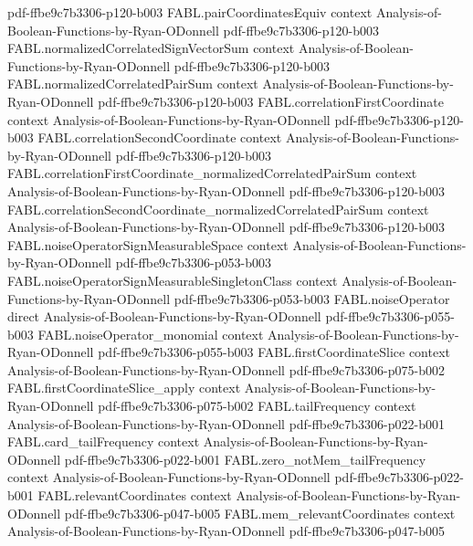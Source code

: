 \begin{theorem}
  {pdf-ffbe9c7b3306-p120-b003}
\proofstep
  {FABL.pairCoordinatesEquiv}
  {context}
  {Analysis-of-Boolean-Functions-by-Ryan-ODonnell}
  {pdf-ffbe9c7b3306-p120-b003}
\proofstep
  {FABL.normalizedCorrelatedSignVectorSum}
  {context}
  {Analysis-of-Boolean-Functions-by-Ryan-ODonnell}
  {pdf-ffbe9c7b3306-p120-b003}
\proofstep
  {FABL.normalizedCorrelatedPairSum}
  {context}
  {Analysis-of-Boolean-Functions-by-Ryan-ODonnell}
  {pdf-ffbe9c7b3306-p120-b003}
\proofstep
  {FABL.correlationFirstCoordinate}
  {context}
  {Analysis-of-Boolean-Functions-by-Ryan-ODonnell}
  {pdf-ffbe9c7b3306-p120-b003}
\proofstep
  {FABL.correlationSecondCoordinate}
  {context}
  {Analysis-of-Boolean-Functions-by-Ryan-ODonnell}
  {pdf-ffbe9c7b3306-p120-b003}
\proofstep
  {FABL.correlationFirstCoordinate_normalizedCorrelatedPairSum}
  {context}
  {Analysis-of-Boolean-Functions-by-Ryan-ODonnell}
  {pdf-ffbe9c7b3306-p120-b003}
\proofstep
  {FABL.correlationSecondCoordinate_normalizedCorrelatedPairSum}
  {context}
  {Analysis-of-Boolean-Functions-by-Ryan-ODonnell}
  {pdf-ffbe9c7b3306-p120-b003}
\proofstep
  {FABL.noiseOperatorSignMeasurableSpace}
  {context}
  {Analysis-of-Boolean-Functions-by-Ryan-ODonnell}
  {pdf-ffbe9c7b3306-p053-b003}
\proofstep
  {FABL.noiseOperatorSignMeasurableSingletonClass}
  {context}
  {Analysis-of-Boolean-Functions-by-Ryan-ODonnell}
  {pdf-ffbe9c7b3306-p053-b003}
\proofstep
  {FABL.noiseOperator}
  {direct}
  {Analysis-of-Boolean-Functions-by-Ryan-ODonnell}
  {pdf-ffbe9c7b3306-p055-b003}
\proofstep
  {FABL.noiseOperator_monomial}
  {context}
  {Analysis-of-Boolean-Functions-by-Ryan-ODonnell}
  {pdf-ffbe9c7b3306-p055-b003}
\proofstep
  {FABL.firstCoordinateSlice}
  {context}
  {Analysis-of-Boolean-Functions-by-Ryan-ODonnell}
  {pdf-ffbe9c7b3306-p075-b002}
\proofstep
  {FABL.firstCoordinateSlice_apply}
  {context}
  {Analysis-of-Boolean-Functions-by-Ryan-ODonnell}
  {pdf-ffbe9c7b3306-p075-b002}
\proofstep
  {FABL.tailFrequency}
  {context}
  {Analysis-of-Boolean-Functions-by-Ryan-ODonnell}
  {pdf-ffbe9c7b3306-p022-b001}
\proofstep
  {FABL.card_tailFrequency}
  {context}
  {Analysis-of-Boolean-Functions-by-Ryan-ODonnell}
  {pdf-ffbe9c7b3306-p022-b001}
\proofstep
  {FABL.zero_notMem_tailFrequency}
  {context}
  {Analysis-of-Boolean-Functions-by-Ryan-ODonnell}
  {pdf-ffbe9c7b3306-p022-b001}
\proofstep
  {FABL.relevantCoordinates}
  {context}
  {Analysis-of-Boolean-Functions-by-Ryan-ODonnell}
  {pdf-ffbe9c7b3306-p047-b005}
\proofstep
  {FABL.mem_relevantCoordinates}
  {context}
  {Analysis-of-Boolean-Functions-by-Ryan-ODonnell}
  {pdf-ffbe9c7b3306-p047-b005}
\proofstep

\end{theorem}
